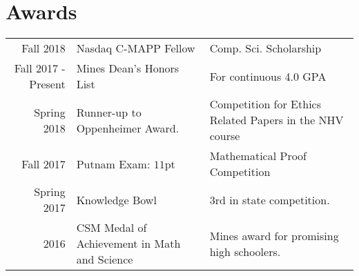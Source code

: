 \documentclass[]{deedy-resume-openfont}
\begin{document}
\begin{minipage}[t]{0.55\textwidth}

%
%

\end{minipage} 


\section{Awards} 
\begin{tabular}{rll}
Fall 2018 & Nasdaq C-MAPP Fellow & Comp. Sci. Scholarship \\
Fall 2017 - Present & Mines Dean's Honors List & For continuous 4.0 GPA \\
Spring 2018 & Runner-up to Oppenheimer Award. & Competition for Ethics Related Papers in the NHV course \\
Fall 2017 & Putnam Exam: \(11\)pt & Mathematical Proof Competition \\
Spring 2017 & Knowledge Bowl & 3rd in state competition. \\
2016	     & CSM Medal of Achievement in Math and Science & Mines award for promising high schoolers. \\
\end{tabular}
\end{document}
